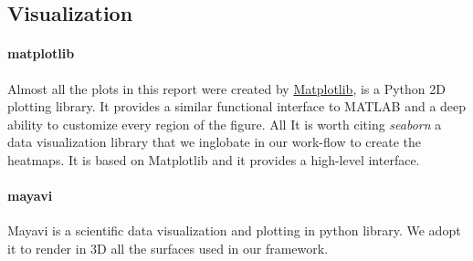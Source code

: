 \documentclass[../document.tex]{subfiles}
\begin{document}
\subsection{Visualization}
\paragraph{matplotlib}Almost all the plots in this report were created by \href{https://matplotlib.org/}{Matplotlib}, is a Python 2D plotting library. It provides a similar functional interface to MATLAB and a deep ability to customize every region of the figure. All 
It is worth citing \emph{seaborn} a data visualization library that we inglobate in our work-flow to create the heatmaps. It is based on Matplotlib and it provides a high-level interface.
\paragraph{mayavi}Mayavi is a scientific data visualization and plotting in python library. We adopt it to render in 3D all the surfaces used in our framework.
\end{document}
